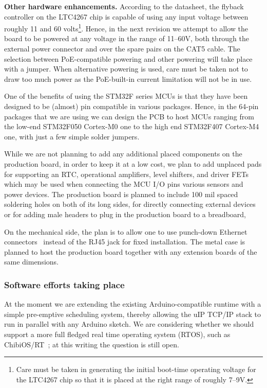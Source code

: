 \documentclass[draft,a4paper]{siamltex}
\begin{document}
{\bf Other hardware enhancements.}
According to the datasheet, the flyback controller on the LTC4267 chip
is capable of using any input voltage between roughly 11 and 60
volts\footnote{Care must be taken in generating the initial
boot-time operating voltage for the LTC4267 chip so that it is placed
at the right range of roughly 7--9V.}.  Hence, in the next revision we
attempt to allow the board to be powered at any voltage in the range
of 11--60V, both through the external power connector and over the
spare pairs on the CAT5 cable.  The selection between PoE-compatible
powering and other powering will take place with a jumper.  When
alternative powering is used, care must be taken not to draw too much
power as the PoE-built-in current limitation will not be in use.

One of the benefits of using the STM32F series MCUs is that they have
been designed to be (almost) pin compatible in various packages.
Hence, in the 64-pin packages that we are using we can design the PCB
to host MCUs ranging from the low-end STM32F050 Cortex-M0 one to the
high end STM32F407 Cortex-M4 one, with just a few simple solder
jumpers.

While we are not planning to add any additional placed components on
the production board, in order to keep it at a low cost, we plan to
add unplaced pads for supporting an RTC, operational amplifiers, level
shifters, and driver FETs which may be used when connecting the MCU
I/O pins various sensors and power devices.  The production board is
planned to include 100 mil spaced soldering holes on both of its long
sides, for directly connecting external devices or for adding male
headers to plug in the production board to a breadboard,

On the mechanical side, the plan is to allow one to use
punch-down Ethernet connectors~\cite{Krone} instead of the RJ45 jack
for fixed installation.  The metal case is planned to host the
production board together with any extension boards of the same
dimensions.

\subsubsection{Software efforts taking place}

At the moment we are extending the existing Arduino-compatible runtime
with a simple pre-emptive scheduling system, thereby allowing the uIP
TCP/IP stack to run in parallel with any Arduino sketch.  We are
considering whether we should support a more full fledged real time
operating system (RTOS), such as ChibiOS/RT~\cite{ChibiOS}; at this
writing the question is still open.
\end{document}
